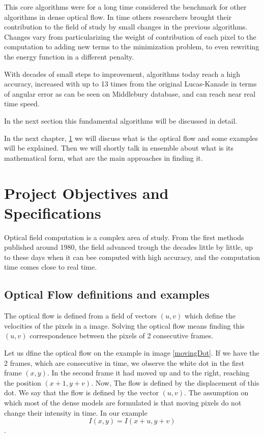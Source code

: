 \documentclass[12pt,a4paper,twoside]{report}
\begin{document}
This core algorithms were for a long time considered the benchmark for other algorithms in dense optical flow. 
In time others researchers brought their contribution to the field of study by small changes in the previous algorithms. Changes vary from particularizing the weight of contribution of each pixel to the computation to adding new terms to the minimization problem, to even rewriting the energy function in a different penalty. 

With decades of small steps to improvement, algorithms today reach a high accuracy, increased with up to 13 times from the original Lucas-Kanade in terms of angular error as can be seen on Middlebury database, and can reach near real time speed.

In the next section this fundamental algorithms will be discussed in detail.

In the next chapter,  \ref{POS} we will discuss what is the optical flow and some examples will be explained. Then we will shortly talk in ensemble about what is its mathematical form, what are the main approaches in finding it. 



\chapter{Project Objectives and Specifications} \label{POS}
{\color{red}{must be about 6 pages}}


Optical field computation is a complex area of study. From the first methods published around 1980, the field advanced trough the decades little by little, up to these days when it can bee computed with high accuracy, and the computation time comes close to real time.


\section{Optical Flow definitions and examples}

The optical flow is defined from a field of vectors $(u,v)$ which define the velocities of the pixels in a image.
Solving the optical flow means finding this $(u,v)$ correspondence between the pixels of 2 consecutive frames.

Let us dfine the optical flow on the example in image \ref{movingDot}. If we have the 2 frames, which are consecutive in time, we observe the white dot in the first frame $(x,y)$. In the second frame it had moved up and to the right, reaching the position $(x+1, y+v)$. Now, The flow is defined by the displacement of this dot. We say that the flow is defined by the vector $(u,v)$. The assumption on which most of the dense models are formulated is that moving pixels do not change their intensity in time. In our example $$I(x,y) = I(x+u, y+v)$$.
\end{document}
